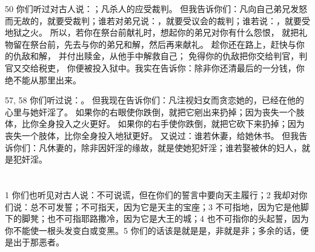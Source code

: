 \par

50  你们听过对古人说：；凡杀人的应受裁判。 但我告诉你们：凡向自己弟兄发怒而无故的，就要受裁判；谁若对弟兄说：，就要受议会的裁判；谁若说：，就要受地狱之火。 所以，若你在祭台前献礼时，想起你的弟兄对你有什么怨恨， 就把礼物留在祭台前，先去与你的弟兄和解，然后再来献礼。 趁你还在路上，赶快与你的仇敌和解， 并付出赎金，从他手中解救自己； 免得你的仇敌把你交给判官，判官又交给税吏， 你便被投入狱中。我实在告诉你：除非你还清最后的一分钱，你绝不能从那里出来。\par

57, 58  你们听过说：。 但我现在告诉你们：凡注视妇女而贪恋她的，已经在他的心里与她奸淫了。 如果你的右眼使你跌倒，就把它剜出来扔掉；因为丧失一个肢体，比你全身投入之火更好。 如果你的右手使你跌倒，就把它砍下来扔掉；因为丧失一个肢体，比你全身投入地狱更好。 又说过：谁若休妻，给她休书。 但我告诉你们：凡休妻的，除非因奸淫的缘故，就是使她犯奸淫；谁若娶被休的妇人，就是犯奸淫。\par



\section{}

1 你们也听见对古人说：不可说谎，但在你们的誓言中要向天主履行；2 我却对你们说：总不可发誓；不可指天，因为它是天主的宝座；3 不可指地，因为它是他脚下的脚凳；也不可指耶路撒冷，因为它是大王的城；4 也不可指你的头起誓，因为你不能使一根头发变白或变黑。5 你们的话该是就是是，非就是非；多余的话，便是出于那恶者。\par


